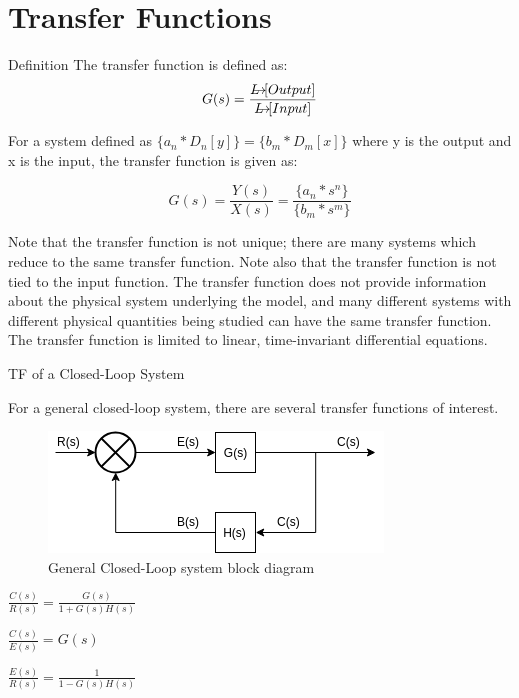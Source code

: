 \documentclass{../templates/topic}
\begin{document}
\graphicspath{{assets/}{ch2a_Transfer_Functions/assets/}}

\chapter{Transfer Functions}

\begin{section}{Definition}
	The transfer function is defined as:
	\begin{equation}
		G(s) = \frac{\laplace[Output]}{\laplace[Input]}
	\end{equation}
	
	For a system defined as $\{a_{n}*D_{n}[y] \} = \{b_{m}*D_{m}[x] \}$ where y is the output and x is the input, the transfer function is given as:
	
	\begin{equation}
		G(s) = \frac{Y(s)}{X(s)} = \frac{\{a_{n}*s^{n}\}}{\{b_{m}*s^{m}\}}
	\end{equation}
	
	Note that the transfer function is not unique; there are many systems which reduce to the same transfer function.
	Note also that the transfer function is not tied to the input function.
	The transfer function does not provide information about the physical system underlying the model, and many different systems with different physical quantities being studied can have the same transfer function.
	The transfer function is limited to linear, time-invariant differential equations.
	
\end{section}

\begin{section}{TF of a Closed-Loop System}
	
	For a general closed-loop system, there are several transfer functions of interest.
	
	\begin{figure}[H]
		\includegraphics[width=\textwidth]{closed_loop.png}
		\caption{General Closed-Loop system block diagram}
	\end{figure}
	
	 $\frac{C(s)}{R(s)}=\frac{G(s)}{1+G(s)H(s)}$
	
	 $\frac{C(s)}{E(s)}=G(s)$
	
	 $\frac{E(s)}{R(s)}=\frac{1}{1-G(s)H(s)}$
	
\end{section}
\end{document}
